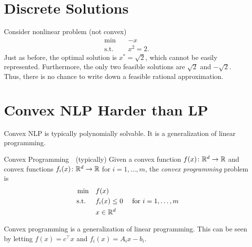 \documentclass[../open-optimization/open-optimization.tex]{subfiles}
\begin{document}
\section{Discrete Solutions}
Consider nonlinear problem (not convex)
\begin{equation}
\begin{array}{rl}
\min \quad & -x\\
\text{s.t.} \quad & x^2 = 2.
\end{array}
\end{equation}
Just as before, the optimal solution is $x^* = \sqrt{2}$, which cannot be easily represented.  Furthermore, the only two feasible solutions are $\sqrt{2}$ and $-\sqrt{2}$.  Thus, there is no chance to write down a feasible rational approximation.

\section{Convex NLP Harder than LP}
Convex NLP is typically polynomially solvable.  It is a generalization of linear programming.  
\begin{general}{Convex Programming}{\polynomial\ \  (typically)}
Given a convex function $f(x)\colon {\mathbb{R}}^d \to {\mathbb{R}}$ and convex functions $f_i(x)\colon {\mathbb{R}}^d \to {\mathbb{R}}$ for $i=1, \dots, m$,  the \emph{convex programming} problem is
\begin{equation}
\label{eq:convex-programming}
\begin{split}
\min \quad & f(x)\\
\text{ s.t. }  \quad & f_i(x) \leq 0  \quad  \text{ for } i=1, \dots, m\\
& x \in {\mathbb{R}}^d
\end{split}
\end{equation}
\end{general}
\begin{example}
Convex programming is a generalization of linear programming.  This can be seen by letting $f(x) = c^\top x$ and $f_i(x) = A_i x - b_i$.  
\end{example}
\end{document}
